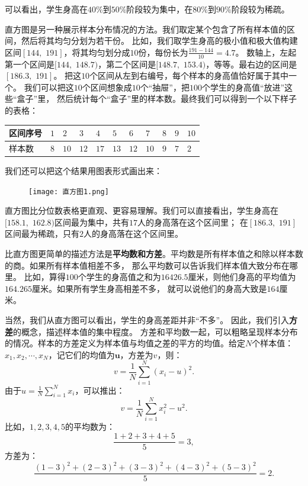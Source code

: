 \documentclass[12pt,UTF8]{ctexbook}
\begin{document}
可以看出，学生身高在$40\%$到$50\%$阶段较为集中，在$80\%$到$90\%$阶段较为稀疏。


直方图是另一种展示样本分布情况的方法。我们取定某个包含了所有样本值的区间，然后将其均匀分划为若干份。
比如，我们取学生身高的极小值和极大值构建区间$[144, \,\,191]$，将其均匀划分成$10$份，每份长为$\frac{191-144}{10}=4.7$。
数轴上，左起第一个区间是$[144, \,\,148.7)$，第二个区间是$[148.7, \,\,153.4)$，等等。最右边的区间是$[186.3, \,\, 191]$。
把这$10$个区间从左到右编号，每个样本的身高值恰好属于其中一个。
我们可以把这$10$个区间想象成$10$个“抽屉”，把$100$个学生的身高值“放进”这些“盒子”里，
然后统计每个“盒子”里的样本数。最终我们可以得到一个以下样子的表格：
\begin{center}
    \begin{tabular}{ | p{4em}<{\centering} | p{1.7em}<{\centering} | p{1.7em}<{\centering} | p{1.7em}<{\centering} | p{1.7em}<{\centering} | p{1.7em}<{\centering} | p{1.7em}<{\centering} | p{1.7em}<{\centering} | p{1.7em}<{\centering} | p{1.7em}<{\centering} | p{1.7em}<{\centering} | }
        \hline
        区间序号 & $1$ & $2$  & $3$  & $4$  & $5$  & $6$  & $7$  & $8$ & $9$ & $10$ \\ [0.5ex] 
        \hline
        样本数   & $8$ & $10$ & $12$ & $17$ & $13$ & $12$ & $10$ & $9$ & $7$ & $2$  \\  
        \hline
    \end{tabular}
\end{center}
我们还可以把这个结果用图表形式画出来：

\begin{figure}[h] %
    \vspace{8pt}
    \centering
    \texttt{[image: 直方图1.png]}
\end{figure}

直方图比分位数表格更直观、更容易理解。我们可以直接看出，学生身高在$[158.1, \,\, 162.8)$区间最为集中，共有$17$人的身高落在这个区间里；
在$[186.3, \,\, 191]$区间最为稀疏，只有$2$人的身高落在这个区间里。

比直方图更简单的描述方法是\textbf{平均数和方差}。平均数是所有样本值之和除以样本数的商。如果所有样本值相差不多，
那么平均数可以告诉我们样本值大致分布在哪里。
比如，算得$100$个学生的身高值之和为$16426.5$厘米，则他们身高的平均值为$164.265$厘米。如果所有学生身高相差不多，
就可以说他们的身高大致是$164$厘米。

当然，我们从直方图可以看出，学生的身高差距并非“不多”。
因此，我们引入\textbf{方差}的概念，描述样本值的集中程度。
方差和平均数一起，可以粗略呈现样本分布的情况。样本的方差定义为样本值与均值之差的平方的均值。给定$N$个样本值：
$x_1, x_2, \cdots, x_N$，记它们的均值为$\mathbf{u}$，方差为$v$，则：
$$ v = \frac{1}{N}\sum_{i=1}^N \left(x_i - u\right)^2.$$
由于$u = \frac{1}{N}\sum_{i=1}^N x_i$，可以推出：
$$v = \frac{1}{N}\sum_{i=1}^N x_i^2 - u^2.$$
比如，$1,2,3,4,5$的平均数为：
$$ \frac{1+2+3+4+5}{5} = 3,$$
方差为：
$$ \frac{(1 - 3)^2 + (2 - 3)^2 + (3 - 3)^2 + (4 - 3)^2 + (5 - 3)^2}{5} = 2.$$
\end{document}
